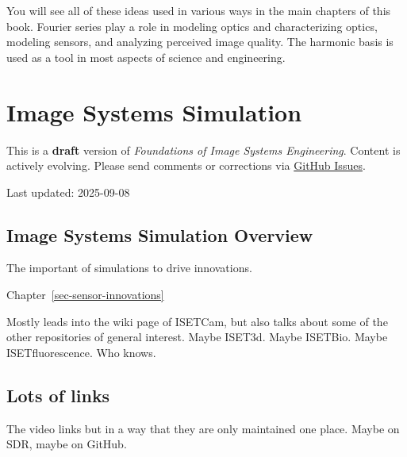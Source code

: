 \documentclass[
  letterpaper,
]{book}
\begin{document}
You will see all of these ideas used in various ways in the main
chapters of this book. Fourier series play a role in modeling optics and
characterizing optics, modeling sensors, and analyzing perceived image
quality. The harmonic basis is used as a tool in most aspects of science
and engineering.

\chapter{Image Systems Simulation}\label{sec-isetcam}

\begin{tcolorbox}[enhanced jigsaw, colframe=quarto-callout-warning-color-frame, titlerule=0mm, rightrule=.15mm, opacitybacktitle=0.6, colback=white, leftrule=.75mm, coltitle=black, title=\textcolor{quarto-callout-warning-color}{\faExclamationTriangle}\hspace{0.5em}{Work in Progress}, bottomrule=.15mm, colbacktitle=quarto-callout-warning-color!10!white, breakable, left=2mm, bottomtitle=1mm, toptitle=1mm, opacityback=0, arc=.35mm, toprule=.15mm]

This is a \textbf{draft} version of \emph{Foundations of Image Systems
Engineering}. Content is actively evolving. Please send comments or
corrections via \href{https://github.com/wandell/FISE-git/issues}{GitHub
Issues}.

Last updated: 2025-09-08

\end{tcolorbox}

\section{Image Systems Simulation Overview}\label{sec-isetcam-overview}

The important of simulations to drive innovations.

Chapter~\ref{sec-sensor-innovations}

Mostly leads into the wiki page of ISETCam, but also talks about some of
the other repositories of general interest. Maybe ISET3d. Maybe ISETBio.
Maybe ISETfluorescence. Who knows.

\section{Lots of links}\label{lots-of-links}

The video links but in a way that they are only maintained one place.
Maybe on SDR, maybe on GitHub.
\end{document}
